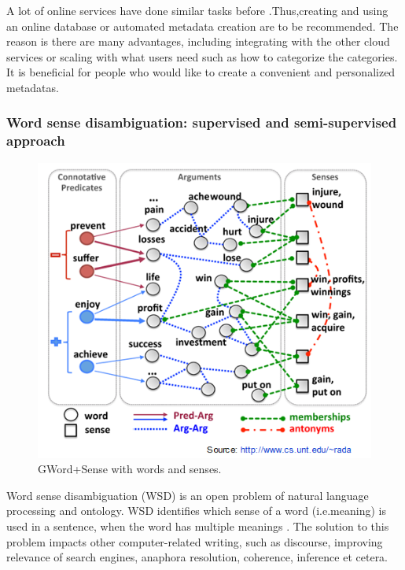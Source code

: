 A lot of online services have done similar tasks before .Thus,creating and using an online database or automated metadata creation are to be recommended. The reason is there are many advantages, including integrating with the other cloud services or scaling with what users need such as how to categorize the categories. It is beneficial for people who would like to create a convenient and personalized metadatas.    \\

\subsubsection*{Word sense disambiguation: supervised and semi-supervised approach}

\begin{figure}[tbh]
	\begin{center}
		\includegraphics[width=\columnwidth]{union(WSD)}
	\end{center}
	\caption{GWord+Sense with words and senses. \label{fig1}}
\end{figure}

Word sense disambiguation (WSD) is an open problem of natural language processing and ontology. WSD identifies which sense of a word (i.e.meaning) is used in a sentence, when the word has multiple meanings \cite{Du2013}. The solution to this problem impacts other computer-related writing, such as discourse, improving relevance of search engines, anaphora resolution, coherence, inference et cetera.

